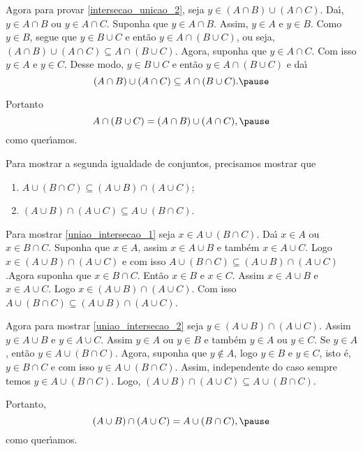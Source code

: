 \documentclass{beamer}
\begin{document}
    \begin{frame}
        Agora para provar \ref{intersecao_unicao_2}, \pause seja $y \in (A \cap B) \cup (A \cap C)$. \pause Da{\'\i}, $y \in A\cap B$ \pause ou $y \in A \cap C$. \pause Suponha que $y \in A \cap B$. \pause Assim, $y \in A$ \pause e $y \in B$. \pause Como $y \in B$, \pause segue que $y \in B \cup C$ \pause e ent{\~a}o $y \in A \cap (B \cup C)$, \pause ou seja, $(A \cap B) \cup (A \cap C) \subseteq A \cap (B \cup C)$. \pause Agora, suponha que $y \in A \cap C$. \pause Com isso $y \in A$ \pause e $y \in C$. \pause Desse modo, $y \in B \cup C$ \pause e ent{\~a}o $y \in A \cap (B \cup C)$ \pause e da{\'\i}\pause
        \[
            (A \cap B) \cup (A \cap C) \subseteq A \cap (B \cup C).\pause
        \]

        Portanto
        \[
            A \cap (B \cup C)=(A \cap B) \cup (A \cap C),\pause
        \]
        como quer{\'\i}amos.
    \end{frame}
    \begin{frame}
        Para mostrar a segunda igualdade de conjuntos, precisamos mostrar que\pause
        \begin{enumerate}[label=({\arabic*})]
            \item $A \cup (B \cap C) \subseteq (A \cup B) \cap (A \cup C)$;\label{uniao_intersecao_1}\pause
            \item $(A \cup B) \cap (A \cup C) \subseteq A \cup (B \cap C)$.\label{uniao_intersecao_2}\pause
        \end{enumerate}

        Para mostrar \ref{uniao_intersecao_1} seja $x \in A \cup (B \cap C)$. \pause Da{\'\i} $x \in A$ \pause ou $x \in B \cap C$. \pause Suponha que $x \in A$, \pause assim $x \in A \cup B$ \pause e tamb\'em $x \in A \cup C$. Logo $x \in (A \cup B) \cap (A \cup C)$ \pause e com isso $A \cup (B \cap C) \subseteq (A \cup B) \cap (A \cup C)$.\pause Agora suponha que $x \in B \cap C$. \pause Ent\~ao $x \in B$ e $x \in C$. Assim $x \in A \cup B$ \pause e $x \in A \cup C$. \pause Logo $x \in (A \cup B) \cap (A \cup C)$. \pause Com isso $A \cup (B \cap C) \subseteq (A \cup B) \cap (A \cup C)$.\pause

        Agora para mostrar \ref{uniao_intersecao_2} seja $y \in (A \cup B) \cap (A \cup C)$. \pause Assim $y \in A \cup B$ \pause e $y \in A \cup C$. \pause Assim $y \in A$ \pause ou $y \in B$ \pause e tamb\'em $y \in A$ \pause ou $y \in C$. \pause Se $y \in A$, \pause ent\~ao $y \in A \cup (B \cap C)$. Agora, suponha que $y \notin A$, \pause logo $y \in B$ e $y \in C$, \pause isto \'e, $y \in B \cap C$ e com isso $y \in A \cup (B \cap C)$. Assim, \pause independente do caso sempre temos $y \in A \cup (B \cap C)$. \pause Logo, $(A \cup B) \cap (A \cup C) \subseteq A \cup (B \cap C)$.\pause

        Portanto,\pause
        \[
            (A\cup B) \cap (A\cup C) = A \cup (B\cap C),\pause
        \]
        como quer{\'\i}amos. \qedsymbol \pause
    \end{frame}
\end{document}
